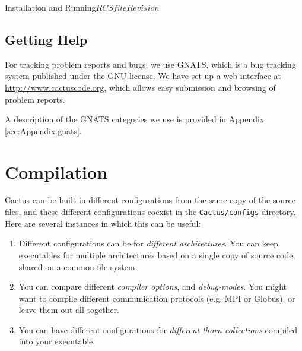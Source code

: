 \begin{cactuspart}{Installation and Running}{$RCSfile$}{$Revision$}

\section{Getting Help}
\label{sec:gehe}

For tracking problem reports and bugs, we use GNATS, which is a bug tracking
system published under the GNU license. We have set up a web interface at
\url{http://www.cactuscode.org}, which allows easy submission and browsing
of problem reports.

A description of the GNATS categories we use is provided in Appendix
\ref{sec:Appendix.gnats}.



\chapter{Compilation}



Cactus can be built in different configurations from the same copy of
the source files, and these different configurations coexist in the
\texttt{Cactus/configs} directory. Here are several instances in which
 this can be useful:

\begin{enumerate}
\item{}Different configurations can be for \emph{different
architectures}. You can keep executables for multiple architectures
based on a single copy of source code, shared on a common file
system.
\item{} You can compare different \textit{compiler options}, and \textit{debug-modes}.
  You might want to compile different communication protocols
  (e.g. MPI or Globus), or leave them out all together.
\item{} You can have different configurations for \textit{different thorn
    collections} compiled into your executable.
\end{enumerate}


\end{cactuspart}
